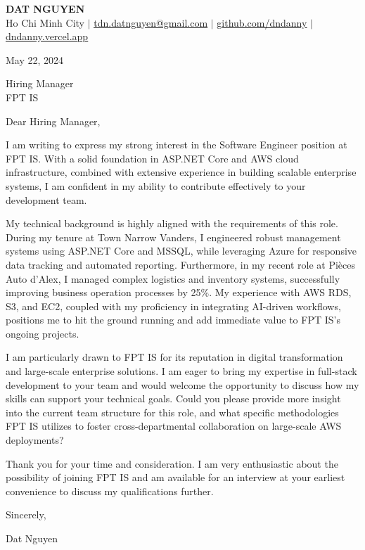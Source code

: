 \documentclass[letterpaper,11pt]{article}
\begin{document}
\begin{center}
\textbf{\Huge \scshape DAT NGUYEN} \\ \vspace{1pt}
\small Ho Chi Minh City $|$ \href{mailto:tdn.datnguyen@gmail.com}{\underline{tdn.datnguyen@gmail.com}} $|$ \href{https://github.com/dndanny}{\underline{github.com/dndanny}} $|$ \href{https://dndanny.vercel.app}{\underline{dndanny.vercel.app}}
\end{center}

\vspace{10pt}

May 22, 2024

Hiring Manager \\
FPT IS

Dear Hiring Manager,

I am writing to express my strong interest in the Software Engineer position at FPT IS. With a solid foundation in ASP.NET Core and AWS cloud infrastructure, combined with extensive experience in building scalable enterprise systems, I am confident in my ability to contribute effectively to your development team.

My technical background is highly aligned with the requirements of this role. During my tenure at Town Narrow Vanders, I engineered robust management systems using ASP.NET Core and MSSQL, while leveraging Azure for responsive data tracking and automated reporting. Furthermore, in my recent role at Pièces Auto d'Alex, I managed complex logistics and inventory systems, successfully improving business operation processes by 25\%. My experience with AWS RDS, S3, and EC2, coupled with my proficiency in integrating AI-driven workflows, positions me to hit the ground running and add immediate value to FPT IS's ongoing projects.

I am particularly drawn to FPT IS for its reputation in digital transformation and large-scale enterprise solutions. I am eager to bring my expertise in full-stack development to your team and would welcome the opportunity to discuss how my skills can support your technical goals. Could you please provide more insight into the current team structure for this role, and what specific methodologies FPT IS utilizes to foster cross-departmental collaboration on large-scale AWS deployments?

Thank you for your time and consideration. I am very enthusiastic about the possibility of joining FPT IS and am available for an interview at your earliest convenience to discuss my qualifications further.

Sincerely,

Dat Nguyen
\end{document}
